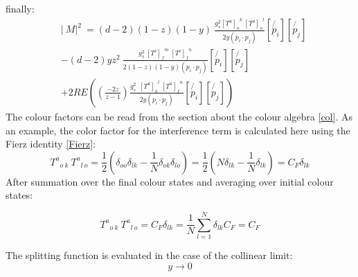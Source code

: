finally:
\begin{equation}
\begin{split}
&\lvert\:M\lvert^2\: = (d-2)(1-z)(1-y)\:\frac{g_s^2  {[T^a]_{o}}^k \: {[T^a]_o}^l }{2y(p_i \cdot p_j)}
[\not{p_i}][\not{p_j}]\\
&-(d-2)yz^2\:\frac{g_s^2 \: {[T^c]_f}^m \: {[T^c]_{f}}^n }{2(1-z)(1-y)(p_i \cdot p_j)}
[\not{p_i}][\not{p_j}]\\
&+2RE((\frac{-2z}{z-1}) \frac{g_s^2 \:\:{[T^a]_o}^l \:{[T^a]_{f}}^n }{2y(p_i \cdot p_j)} 
[\not{p_i}][\not{p_j}])
\end{split}
\end{equation}
The colour factors can be read from the section about the colour algebra \ref{col}. As an example, the color factor for the interference term is calculated here using the Fierz identity \ref{Fierz}:
\begin{equation}
{T^a}_{o\:k} \: {T^a}_{l\:o} = \frac{1}{2}(\delta_{oo}\delta_{lk}-\frac{1}{N}\delta_{ok}\delta_{lo})= \frac{1}{2}(N\delta_{lk}-\frac{1}{N}\delta_{lk})=C_F \delta_{lk}
\end{equation}
After summation over the final colour states and averaging over initial colour states:

\begin{equation}
{T^a}_{o\:k} \: {T^a}_{l\:o}=C_F \delta_{lk}=\frac{1}{N} \displaystyle\sum\limits_{l=1}^ N \delta_{lk}C_F=C_F
\end{equation}

The splitting function is evaluated in the case of the collinear limit:
\begin{equation}
y \longrightarrow 0
\end{equation}


